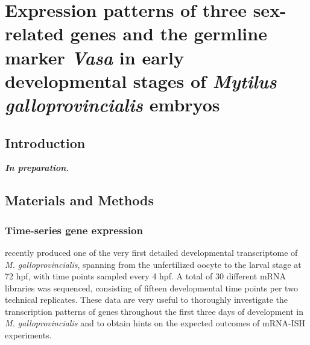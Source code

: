 \documentclass[../main.tex]{subfiles}
\begin{document}
{
\chapter{Expression patterns of three sex-related genes and the germline marker \textit{Vasa} in early developmental stages of \textit{Mytilus galloprovincialis} embryos}
\label{inSitu}


\vspace{5mm}




\vspace{5mm}

}

\newpage

\section{Introduction} \label{chapter4_introduction}

\textbf{\textit{In preparation.}}

\section{Materials and Methods} \label{chapter4_MM}
\subsection{Time-series gene expression} \label{chapter4_MM_rnaseq}
\textbf{\cite{miglioli2024hcrMytilus}} recently produced one of the very first detailed developmental transcriptome of \textit{M. galloprovincialis}, spanning from the unfertilized oocyte to the larval stage at 72 hpf, with time points sampled every 4 hpf. A total of 30 different mRNA libraries was sequenced, consisting of fifteen developmental time points per two technical replicates. These data are very useful to thoroughly investigate the transcription patterns of genes throughout the first three days of development in \textit{M. galloprovincialis} and to obtain hints on the expected outcomes of mRNA-ISH experiments.
\end{document}
